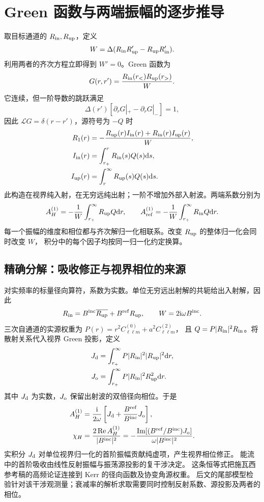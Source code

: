 \documentclass[UTF8,fontset=fandol,11pt,a4paper]{ctexart}
\newcommand{\ii}{\mathrm{i}}
\newcommand{\dd}{\mathrm{d}}
\newcommand{\Rea}{\operatorname{Re}}
\newcommand{\Ima}{\operatorname{Im}}
\newcommand{\Bin}{B^{\mathrm{inc}}}
\newcommand{\Bref}{B^{\mathrm{ref}}}
\newcommand{\AH}{A_H^{(1)}}
\newcommand{\Aref}{A_{\mathrm{ref}}^{(1)}}
\numberwithin{equation}{section}
\begin{document}
\section{Green 函数与两端振幅的逐步推导}
取目标通道的 $R_{\rm in},R_{\rm up}$，定义
\begin{equation}
W=\Delta(R_{\rm in}R'_{\rm up}-R_{\rm up}R'_{\rm in}).
\end{equation}
利用两者的齐次方程立即得到 $W'=0$。Green 函数为
\begin{equation}
G(r,r')=\frac{R_{\rm in}(r_<)R_{\rm up}(r_>)}W.
\end{equation}
它连续，但一阶导数的跳跃满足
\begin{equation}\Delta(r')[\partial_rG|_+-\partial_rG|_-]=1,\end{equation}
因此 $\mathcal L G=\delta(r-r')$，源符号为 $-Q$ 时
\begin{align}
R_1(r)&=-\frac{R_{\rm up}(r)I_{\rm in}(r)+R_{\rm in}(r)I_{\rm up}(r)}W,\\
I_{\rm in}(r)&=\int_{r_+}^r R_{\rm in}(s)Q(s)\dd s,\\
I_{\rm up}(r)&=\int_r^\infty R_{\rm up}(s)Q(s)\dd s.
\end{align}
此构造在视界纯入射，在无穷远纯出射；一阶不增加外部入射波。两端系数分别为
\begin{equation}
\AH=-\frac1W\int_{r_+}^\infty R_{\rm up}Q\dd r,\qquad
\Aref=-\frac1W\int_{r_+}^\infty R_{\rm in}Q\dd r.
\end{equation}
每一个振幅的维度和相位都与齐次解归一化相联系。改变 $R_{\rm up}$ 的整体归一化会同时改变 $W$，
积分中的每个因子均按同一归一化约定换算。

\subsection{精确分解：吸收修正与视界相位的来源}
对实频率的标量径向算符，系数为实数。单位无穷远出射解的共轭给出入射解，因此
\begin{equation}
R_{\rm in}=\Bin\overline{R_{\rm up}}+\Bref R_{\rm up},\qquad
W=2\ii\omega\Bin.
\end{equation}
三次自通道的实源权重为
$P(r)=r^2 C^{(0)}_{\ell\ell m}+a^2 C^{(2)}_{\ell\ell m}$，
且 $Q=P|R_{\rm in}|^2R_{\rm in}$。将散射关系代入视界 Green 投影，定义
\begin{align}
J_{\rm d}&=\int_{r_+}^{\infty}P|R_{\rm in}|^2|R_{\rm up}|^2\dd r,\\
J_{\rm o}&=\int_{r_+}^{\infty}P|R_{\rm in}|^2R_{\rm up}^2\dd r.
\end{align}
其中 $J_{\rm d}$ 为实数，$J_{\rm o}$ 保留出射波的双倍径向相位。于是
\begin{align}
\AH&=\frac{\ii}{2\omega}
\left[J_{\rm d}+\frac{\Bref}{\Bin}J_{\rm o}\right],\\
\chi_H&=\frac{2\Rea\AH}{|\Bin|^2}
=-\frac{\Ima[(\Bref/\Bin)J_{\rm o}]}{\omega|\Bin|^2}.
\label{eq:green-tail-v3}
\end{align}
实积分 $J_{\rm d}$ 对单位视界归一化的首阶振幅贡献纯虚项，产生视界相位修正。
能流中的首阶吸收由线性反射振幅与振荡源投影的复干涉决定。
这条恒等式把施瓦西参考稿的高频论证\cite{HeTianZhangManuscript2026}连接到 Kerr 的径向函数及协变角源权重。
后文的尾部模型检验针对该干涉观测量；衰减率的解析求取需要同时控制反射系数、源投影及两者的相位。
\end{document}
